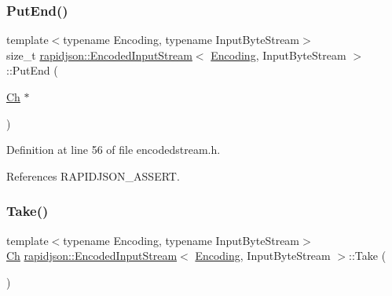 \subsubsection{\texorpdfstring{PutEnd()}{PutEnd()}}
{\footnotesize\ttfamily template$<$typename Encoding, typename Input\+Byte\+Stream$>$ \\
size\+\_\+t \mbox{\hyperlink{classrapidjson_1_1_encoded_input_stream}{rapidjson\+::\+Encoded\+Input\+Stream}}$<$ \mbox{\hyperlink{classrapidjson_1_1_encoding}{Encoding}}, Input\+Byte\+Stream $>$\+::Put\+End (\begin{DoxyParamCaption}\item[{\mbox{\hyperlink{classrapidjson_1_1_encoded_input_stream_ac1cf99de822b615beaa5e33ac989a20a}{Ch}} $\ast$}]{ }\end{DoxyParamCaption})}



Definition at line 56 of file encodedstream.\+h.


\begin{DoxyCode}{0}

\end{DoxyCode}


References R\+A\+P\+I\+D\+J\+S\+O\+N\+\_\+\+A\+S\+S\+E\+RT.

\mbox{\label{classrapidjson_1_1_encoded_input_stream_a6182dbfa7cf1c5f29e1cc0e9b575c95e}} 
\subsubsection{\texorpdfstring{Take()}{Take()}}
{\footnotesize\ttfamily template$<$typename Encoding, typename Input\+Byte\+Stream$>$ \\
\mbox{\hyperlink{classrapidjson_1_1_encoded_input_stream_ac1cf99de822b615beaa5e33ac989a20a}{Ch}} \mbox{\hyperlink{classrapidjson_1_1_encoded_input_stream}{rapidjson\+::\+Encoded\+Input\+Stream}}$<$ \mbox{\hyperlink{classrapidjson_1_1_encoding}{Encoding}}, Input\+Byte\+Stream $>$\+::Take (\begin{DoxyParamCaption}{ }\end{DoxyParamCaption})}



